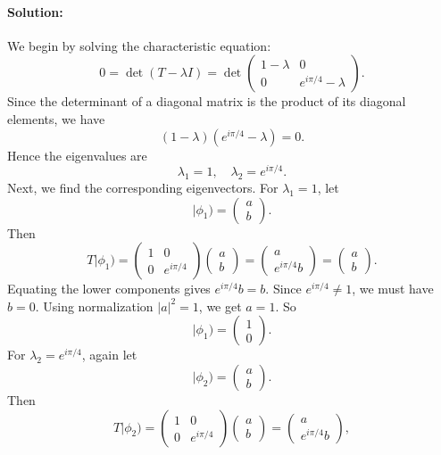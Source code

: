 \documentclass{article}
\begin{document}
\paragraph{Solution:}
We begin by solving the characteristic equation:
\[
0 = \det(T - \lambda I)
= \det\!
\begin{pmatrix}
1 - \lambda & 0 \\
0 & e^{i\pi/4} - \lambda
\end{pmatrix}.
\]
Since the determinant of a diagonal matrix is the product of its diagonal elements, we have
\[
(1 - \lambda)(e^{i\pi/4} - \lambda) = 0.
\]
Hence the eigenvalues are
\[
\lambda_1 = 1,
\quad
\lambda_2 = e^{i\pi/4}.
\]
Next, we find the corresponding eigenvectors. For \(\lambda_1 = 1\), let
\[
|\phi_1) =
\begin{pmatrix}
a\\
b
\end{pmatrix}.
\]
Then
\[
T |\phi_1)
= \begin{pmatrix}
1 & 0\\
0 & e^{i\pi/4}
\end{pmatrix}
\begin{pmatrix}
a \\
b
\end{pmatrix}
=
\begin{pmatrix}
a \\
e^{i\pi/4}b
\end{pmatrix}
=
\begin{pmatrix}
a \\
b
\end{pmatrix}.
\]
Equating the lower components gives \(e^{i\pi/4} b = b\). Since \(e^{i\pi/4} \neq 1\), we must have \(b = 0\). Using normalization \(|a|^2 = 1\), we get \(a = 1\). So
\[
|\phi_1) = 
\begin{pmatrix}
1\\
0
\end{pmatrix}.
\]
For \(\lambda_2 = e^{i\pi/4}\), again let
\[
|\phi_2) = 
\begin{pmatrix}
a\\
b
\end{pmatrix}.
\]
Then
\[
T |\phi_2)
= 
\begin{pmatrix}
1 & 0\\
0 & e^{i\pi/4}
\end{pmatrix}
\begin{pmatrix}
a\\
b
\end{pmatrix}
=
\begin{pmatrix}
a\\
e^{i\pi/4}b
\end{pmatrix},
\]
\end{document}

